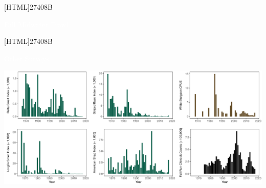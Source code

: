 \documentclass[]{article}\usepackage[]{graphicx}\usepackage[]{color}
\makeatletter
\def\maxwidth{ %
  \ifdim\Gin@nat@width>\linewidth
    \linewidth
  \else
    \Gin@nat@width
  \fi
}
\makeatother
\begin{document}
\vspace{0cm}

\begin{Row}
   \begin{Cell}{1}
			\hspace{35pt}
			\begin{minipage}{466pt}
				[HTML]{27408B}{\parbox[c][12pt]{\textwidth}{
					\begin{center}
						{\LARGE \textcolor{white}{Fall Midwater Trawl}}
					\end{center}
				}}
			\end{minipage}%
			\hspace{52pt}
			\begin{minipage}{205pt}
				[HTML]{27408B}{\parbox[c][12pt]{\textwidth}{
					\begin{center}
						{\LARGE \textcolor{white}{Other Surveys}}
					\end{center}
				}}
			\end{minipage}
   \end{Cell}
\end{Row}

\vspace{-0.2cm}

\begin{Row}
    \begin{Cell}{1}


{\centering \includegraphics[width=\maxwidth]{figures/fish1_main_fig-1} 

}



		\end{Cell}
\end{Row}

\vspace{0.2cm}
\end{document}

